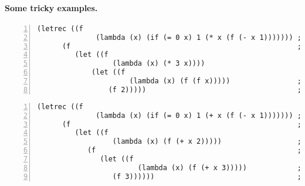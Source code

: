 \documentclass{article}
\begin{document}
\paragraph{Some tricky examples.}

\begin{Verbatim}[frame=single,numbers=left]
  (letrec ((f
              (lambda (x) (if (= 0 x) 1 (* x (f (- x 1))))))) ; f from line 1
      (f                                                      ; f from line 1
         (let ((f
                  (lambda (x) (* 3 x))))
             (let ((f
                      (lambda (x) (f (f x)))))                ; f from line 4
                 (f 2)))))                                    ; f from line 6
\end{Verbatim}

\begin{Verbatim}[frame=single,numbers=left]
  (letrec ((f
              (lambda (x) (if (= 0 x) 1 (+ x (f (- x 1))))))) ; f from line 1
      (f                                                      ; f from line 1
         (let ((f 
                  (lambda (x) (f (+ x 2)))))                  ; f from line 1
            (f                                                ; f from line 4
               (let ((f 
                        (lambda (x) (f (+ x 3)))))            ; f from line 4
                  (f 3))))))                                  ; f from line 6
\end{Verbatim}
\end{document}
